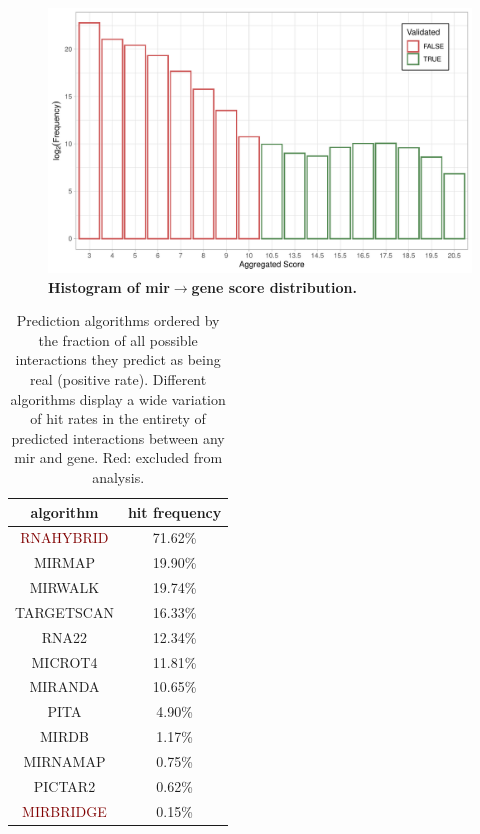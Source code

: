 \begin{figure}
\includegraphics[width=\textwidth]{figures/db-score-hist}
\caption[Graph database organisation.]{\textbf{Histogram of \ac{mir}$\to$gene score distribution.} 
\label{fig:db-score-hist}}
\end{figure}

\begin{table}
\centering
\begin{tabular}{c | c}
algorithm & hit frequency\\ \hline
\hline
\textcolor{Maroon}{RNAHYBRID} & 71.62\%\\ \hline
\textcolor{OliveGreen}{MIRMAP} & 19.90\%\\ \hline
\textcolor{OliveGreen}{MIRWALK} & 19.74\%\\ \hline
\textcolor{OliveGreen}{TARGETSCAN} & 16.33\%\\ \hline
\textcolor{OliveGreen}{RNA22} & 12.34\%\\ \hline
\textcolor{OliveGreen}{MICROT4} & 11.81\%\\ \hline
\textcolor{OliveGreen}{MIRANDA} & 10.65\%\\ \hline
\textcolor{OliveGreen}{PITA} & 4.90\%\\ \hline
\textcolor{OliveGreen}{MIRDB} & 1.17\%\\ \hline
\textcolor{OliveGreen}{MIRNAMAP} & 0.75\%\\ \hline
\textcolor{OliveGreen}{PICTAR2} & 0.62\%\\ \hline
\textcolor{Maroon}{MIRBRIDGE} & 0.15\%\\ \hline
\end{tabular}
\caption{Prediction algorithms ordered by the fraction of all possible interactions they predict as being real (positive rate). Different algorithms display a wide variation of hit rates in the entirety of predicted interactions between any \ac{mir} and gene. Red: excluded from analysis.}
\label{tab:alg.hit.freq.all}
\end{table}

